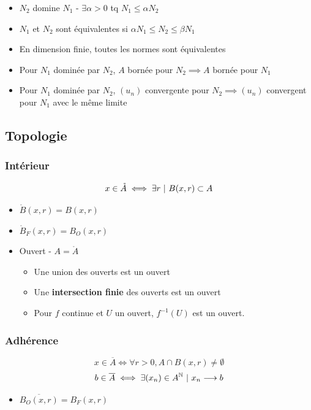 \documentclass[openany]{book}
\begin{document}
\begin{itemize}
    \item $N_2$ domine $N_1$ - $ \exists \alpha > 0$ tq $N_1 \leq \alpha N_2$
    \item $N_1$ et $N_2$ sont équivalentes si $\alpha N_1 \leq N_2 \leq \beta N_1$
    \item En dimension finie, toutes les normes sont équivalentes
    \item Pour $N_1$ dominée par $N_2$, $A$ bornée pour $N_2 \implies A$ bornée pour $N_1$
    \item Pour $N_1$ dominée par $N_2$, $(u_n)$ convergente pour $N_2 \implies (u_n)$ convergent pour $N_1$ avec le même limite
\end{itemize}

\subsection{Topologie}

\subsubsection{Intérieur}
\[ x \in \mathring{A} \iff \exists r \text{ } | \text{ } B(x, r) \subset A \]

\begin{itemize}
    \item $\mathring{B}(x, r) = B(x, r)$
    \item $\mathring{B}_F(x, r) = B_O(x, r)$
    \item Ouvert - $A = \mathring{A}$
    \begin{itemize}
        \item Une union des ouverts est un ouvert
        \item Une \textbf{intersection finie} des ouverts est un ouvert
        \item Pour $f$ continue et $U$ un ouvert, $f^{-1}(U)$ est un ouvert.
    \end{itemize}
\end{itemize}

\subsubsection{Adhérence}

\[x \in \overline{A} \iff \forall r > 0, A \cap B(x, r) \neq \emptyset \]
\[ b \in \overline{A} \iff \exists (x_n) \in A^{\mathbb{N}} \text{ } | \text{ } x_n \longrightarrow b \]

\begin{itemize}
    \item $\overline{B_O(x, r)} = B_F(x, r)$
\end{itemize}
\end{document}
